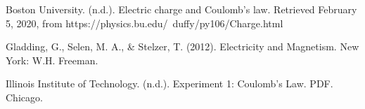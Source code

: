 \documentclass [12pt, letterpaper, twoside]{article}
\begin{document}
  Boston University. (n.d.). Electric charge and Coulomb's law. Retrieved February 5, 2020, from https://physics.bu.edu/~duffy/py106/Charge.html

  Gladding, G., Selen, M. A., \& Stelzer, T. (2012). Electricity and Magnetism. New York: W.H. Freeman.

  Illinois Institute of Technology. (n.d.). Experiment 1: Coulomb's Law. PDF. Chicago.
\end{document}
